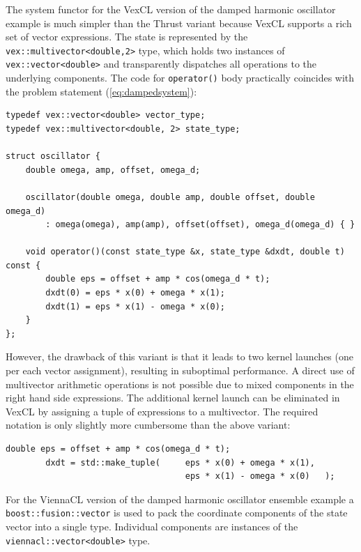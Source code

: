 \documentclass[final]{siamltex}
\newcommand{\code}[1]{\lstinline|#1|}
\newcommand{\eqref}[1]{(\ref{#1})}
\begin{document}
The system functor for the VexCL version of the damped harmonic oscillator
example is much simpler than the Thrust variant because VexCL supports a rich
set of vector expressions. The state is represented by the
\code{vex::multivector<double,2>} type, which holds two instances of
\code{vex::vector<double>} and transparently dispatches all operations to the
underlying components. The code for \code{operator()} body practically
coincides with the problem statement \eqref{eq:dampedsystem}:
\begin{lstlisting}
typedef vex::vector<double> vector_type;
typedef vex::multivector<double, 2> state_type;

struct oscillator {
    double omega, amp, offset, omega_d;

    oscillator(double omega, double amp, double offset, double omega_d)
        : omega(omega), amp(amp), offset(offset), omega_d(omega_d) { }

    void operator()(const state_type &x, state_type &dxdt, double t) const {
        double eps = offset + amp * cos(omega_d * t);
        dxdt(0) = eps * x(0) + omega * x(1);
        dxdt(1) = eps * x(1) - omega * x(0);
    }
};
\end{lstlisting}


However, the drawback of this variant is that it leads
to two kernel launches (one per each vector assignment), resulting in
suboptimal performance. A direct use of multivector arithmetic
operations is not possible due to mixed components in the right hand side expressions.
The additional kernel launch can be eliminated in VexCL by assigning a tuple of expressions to a multivector.
The required notation is only slightly more cumbersome than the above variant:
\begin{lstlisting}[firstnumber=11]
        double eps = offset + amp * cos(omega_d * t);
        dxdt = std::make_tuple(     eps * x(0) + omega * x(1),
                                    eps * x(1) - omega * x(0)   );
\end{lstlisting}

For the ViennaCL version of the damped harmonic oscillator ensemble example a
\code{boost::fusion::vector} is used to pack the coordinate components of the state vector into a
single type. Individual components are instances of the
\code{viennacl::vector<double>} type.
\end{document}
